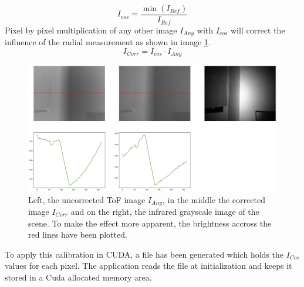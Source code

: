 \begin{equation*}
    I_{cos} = \frac{\min (I_{Ref}) }{I_{Ref}} 
\end{equation*}
Pixel by pixel multiplication of any other image $I_{Any}$ with $I_{cos}$ will correct the influence of the radial measurement as shown in image \ref{im:ToFCorrected}. 
\begin{equation*}
    I_{Corr} = I_{cos}\cdot I_{Any}
\end{equation*}
\begin{figure}[H]
    \centering
    \includegraphics[width=1.0\textwidth]{images/flattened_tof_example.png}
    \caption{Left, the uncorrected ToF image $I_{Any}$, in the middle the corrected image $I_{Corr}$ and on the right, the infrared grayscale image of the scene. To make the effect more apparent, the brightness accross the red lines have been plotted.}
    \label{im:ToFCorrected}
\end{figure}
To apply this calibration in CUDA, a file has been generated which holds the $I_{Cos}$ values for each pixel. The application reads the file at initialization and keeps it stored in a Cuda allocated memory area. 

